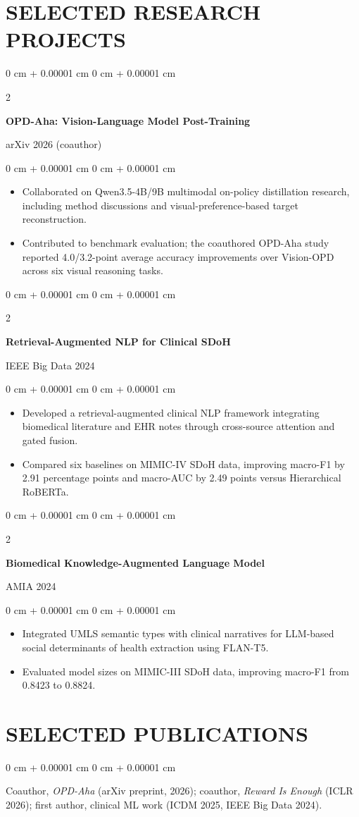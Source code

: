 \documentclass[10pt, letterpaper]{article}
\newenvironment{highlights}{
    \begin{itemize}[
        topsep=0.03 cm,
        parsep=0.03 cm,
        partopsep=0pt,
        itemsep=0pt,
        leftmargin=0 cm + 10pt
    ]
}{
    \end{itemize}
} %
\newenvironment{onecolentry}{
    \begin{adjustwidth}{
        0 cm + 0.00001 cm
    }{
        0 cm + 0.00001 cm
    }
}{
    \end{adjustwidth}
} %
\newenvironment{twocolentry}[2][]{
    \onecolentry
    \def\secondColumn{#2}
    \setcolumnwidth{\fill, 4.5 cm}
    \begin{paracol}{2}
}{
    \switchcolumn \raggedleft \secondColumn
    \end{paracol}
    \endonecolentry
} %
\begin{document}
\section{SELECTED RESEARCH PROJECTS}
\begin{twocolentry}{arXiv 2026 (coauthor)}
\textbf{OPD-Aha: Vision-Language Model Post-Training}
\end{twocolentry}
\begin{onecolentry}
\begin{highlights}
\item Collaborated on Qwen3.5-4B/9B multimodal on-policy distillation research, including method discussions and visual-preference-based target reconstruction.
\item Contributed to benchmark evaluation; the coauthored OPD-Aha study reported 4.0/3.2-point average accuracy improvements over Vision-OPD across six visual reasoning tasks.
\end{highlights}
\end{onecolentry}
\vspace{0.03 cm}
\begin{twocolentry}{IEEE Big Data 2024}
\textbf{Retrieval-Augmented NLP for Clinical SDoH}
\end{twocolentry}
\begin{onecolentry}
\begin{highlights}
\item Developed a retrieval-augmented clinical NLP framework integrating biomedical literature and EHR notes through cross-source attention and gated fusion.
\item Compared six baselines on MIMIC-IV SDoH data, improving macro-F1 by 2.91 percentage points and macro-AUC by 2.49 points versus Hierarchical RoBERTa.
\end{highlights}
\end{onecolentry}
\vspace{0.03 cm}
\begin{twocolentry}{AMIA 2024}
\textbf{Biomedical Knowledge-Augmented Language Model}
\end{twocolentry}
\begin{onecolentry}
\begin{highlights}
\item Integrated UMLS semantic types with clinical narratives for LLM-based social determinants of health extraction using FLAN-T5.
\item Evaluated model sizes on MIMIC-III SDoH data, improving macro-F1 from 0.8423 to 0.8824.
\end{highlights}
\end{onecolentry}
\vspace{0.03 cm}
\section{SELECTED PUBLICATIONS}
\begin{onecolentry}
Coauthor, \textit{OPD-Aha} (arXiv preprint, 2026); coauthor, \textit{Reward Is Enough} (ICLR 2026); first author, clinical ML work (ICDM 2025, IEEE Big Data 2024).
\end{onecolentry}
\end{document}
